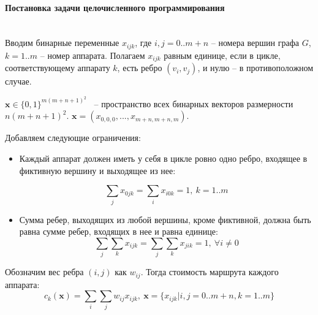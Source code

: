 \documentclass[a4paper,14pt,russian]{article}
\begin{document}


\paragraph{Постановка задачи целочисленного программирования} ~\\

Вводим бинарные переменные $x_{i j k}$, где $i, j = 0..m+n$ -- номера вершин графа $G$, $k = 1..m$ -- номер аппарата. Полагаем $x_{i j k}$ равным единице, если в цикле, соответствующему аппарату $k$, есть ребро $(v_i, v_j)$, и нулю -- в противоположном случае.

$\mathbf{x} \in \{0,1\}^{m (m+n+1)^2}$ ~-- пространство всех бинарных векторов размерности $n (m+n+1)^2$. $\mathbf{x} = (x_{0, 0, 0}, ..., x_{m+n, m+n, m})$.

Добавляем следующие ограничения:
\begin{itemize}

\item Каждый аппарат должен иметь у себя в цикле ровно одно ребро, входящее в фиктивную вершину и выходящее из нее:

\begin{equation} \label{lin1}
 \displaystyle\sum_j x_{0 j k} = \displaystyle\sum_i x_{i 0 k} = 1, ~k = 1..m
\end{equation}

\item Сумма ребер, выходящих из любой вершины, кроме фиктивной, должна быть равна сумме ребер, входящих в нее и равна единице:
\begin{equation}
\displaystyle\sum_j \displaystyle\sum_k x_{i j k} = \displaystyle\sum_j \displaystyle\sum_k x_{j i k} = 1, ~\forall i \neq 0
\end{equation}

\end{itemize}

Обозначим вес ребра $(i, j)$ как $w_{i j}$. Тогда стоимость маршрута каждого аппарата:
\begin{equation}
c_k(\mathbf{x}) = \displaystyle\sum_i \displaystyle\sum_j w_{i j} x_{i j k}, ~\mathbf{x} = \{x_{i j k} | i, j = 0..m+n, k = 1..m\}
\end{equation}
\end{document}
